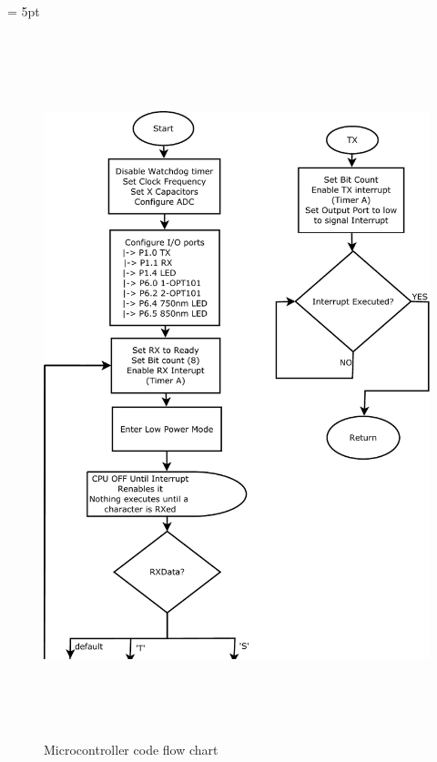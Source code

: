 \headsep = 5pt
\begin{figure}[htp]
\centering
\caption{Microcontroller code flow chart}
\includegraphics[height=8.05in]{cdia-1.pdf}
\end{figure}

